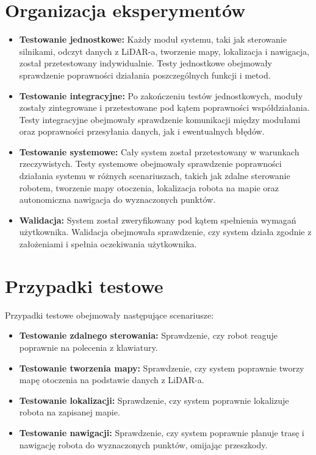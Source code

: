 \documentclass[a4paper,twoside,12pt]{book}
\begin{document}
\section{Organizacja eksperymentów}

\begin{itemize}
	\item \textbf{Testowanie jednostkowe:} Każdy moduł systemu, taki jak sterowanie silnikami, odczyt danych z LiDAR-a, tworzenie mapy, lokalizacja i nawigacja, został przetestowany indywidualnie. Testy jednostkowe obejmowały sprawdzenie poprawności działania poszczególnych funkcji i metod.
	\item \textbf{Testowanie integracyjne:} Po zakończeniu testów jednostkowych, moduły zostały zintegrowane i przetestowane pod kątem poprawności współdziałania. Testy integracyjne obejmowały sprawdzenie komunikacji między modułami oraz poprawności przesyłania danych, jak i ewentualnych błędów.
	\item \textbf{Testowanie systemowe:} Cały system został przetestowany w warunkach rzeczywistych. Testy systemowe obejmowały sprawdzenie poprawności działania systemu w różnych scenariuszach, takich jak zdalne sterowanie robotem, tworzenie mapy otoczenia, lokalizacja robota na mapie oraz autonomiczna nawigacja do wyznaczonych punktów.
	\item \textbf{Walidacja:} System został zweryfikowany pod kątem spełnienia wymagań użytkownika. Walidacja obejmowała sprawdzenie, czy system działa zgodnie z założeniami i spełnia oczekiwania użytkownika.
\end{itemize}

\section{Przypadki testowe}
Przypadki testowe obejmowały następujące scenariusze:
\begin{itemize}
	\item \textbf{Testowanie zdalnego sterowania:} Sprawdzenie, czy robot reaguje poprawnie na polecenia z klawiatury.
	\item \textbf{Testowanie tworzenia mapy:} Sprawdzenie, czy system poprawnie tworzy mapę otoczenia na podstawie danych z LiDAR-a.
	\item \textbf{Testowanie lokalizacji:} Sprawdzenie, czy system poprawnie lokalizuje robota na zapisanej mapie.
	\item \textbf{Testowanie nawigacji:} Sprawdzenie, czy system poprawnie planuje trasę i nawigację robota do wyznaczonych punktów, omijając przeszkody.
\end{itemize}
\newpage
\end{document}
